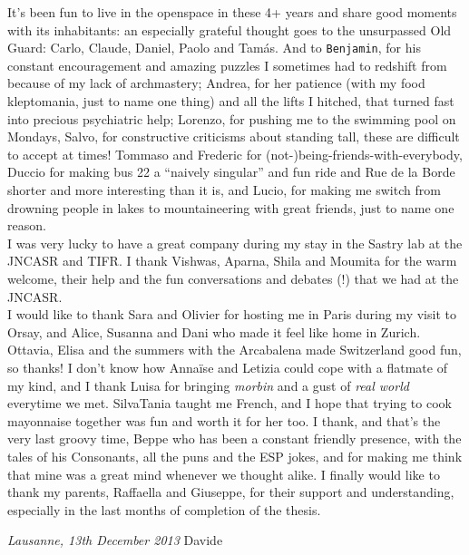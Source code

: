 \clearpage
It's been fun to live in the openspace in these 4+ years and share good moments with its inhabitants: an especially grateful thought goes to the unsurpassed Old Guard: Carlo, Claude, Daniel, Paolo and Tam\'as. And to \verb|Benjamin|, for his constant encouragement and amazing puzzles I sometimes had to redshift from because of my lack of archmastery; Andrea, for her patience (with my food kleptomania, just to name one thing) and all the lifts I hitched, that turned fast into precious psychiatric help; Lorenzo, for pushing me to the swimming pool on Mondays, Salvo, for constructive criticisms about standing tall, these are difficult to accept at times! Tommaso and Frederic for (not-)being-friends-with-everybody, Duccio for making bus 22 a ``naively singular'' and fun ride and Rue de la Borde shorter and more interesting than it is, and Lucio, for making me switch from drowning people in lakes to mountaineering with great friends, just to name one reason. \\
I was very lucky to have a great company during my stay in the Sastry lab at the JNCASR and TIFR. I thank Vishwas, Aparna, Shila and Moumita for the warm welcome, their help and the fun conversations and debates (!) that we had at the JNCASR.\\
I would like to thank Sara and Olivier for hosting me in Paris during my visit to Orsay, and Alice, Susanna and Dani who made it feel like home in Zurich. Ottavia, Elisa and the summers with the Arcabalena made Switzerland good fun, so thanks!
I don't know how Anna\"ise and Letizia could cope with a flatmate of my kind, and I thank Luisa for bringing \emph{morbin} and a gust of \emph{real world} everytime we met. SilvaTania taught me French, and I hope that trying to cook mayonnaise together was fun and worth it for her too. I thank, and that's the very last groovy time, Beppe who has been a constant friendly presence, with the tales of his Consonants, all the puns and the ESP jokes, and for making me think that mine was a great mind whenever we thought alike.
I finally would like to thank my parents, Raffaella and Giuseppe, for their support and understanding, especially in the last months of completion of the thesis.

\bigskip
 
\noindent\textit{Lausanne, 13th December 2013}
\hfill Davide
